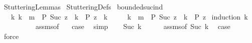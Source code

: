 %
\begin{isabellebody}%
%
%
\isadelimdocument
%
\endisadelimdocument
%
\isatagdocument
%
\isamarkuptrue%
%
\endisatagdocument
{\isafolddocument}%
%
\isadelimdocument
%
\endisadelimdocument
%
\isadelimtheory
%
\endisadelimtheory
%
\isatagtheory
{}\isamarkupfalse%
\ StutteringLemmas\isanewline
\isanewline
{}\ StutteringDefs\isanewline
\isanewline
{}%
\endisatagtheory
{\isafoldtheory}%
%
\isadelimtheory
\isanewline
%
\endisadelimtheory
\isanewline
{}\isamarkupfalse%
\ bounded{\isacharunderscore}suc{\isacharunderscore}ind{\isacharcolon}\isanewline
\ \ \ {\isacartoucheopen}{\isasymAnd}k{\isachardot}\ k\ {\isacharless}\ m\ {\isasymLongrightarrow}\ P\ {\isacharparenleft}Suc\ {\isacharparenleft}z\ {\isacharplus}\ k{\isacharparenright}{\isacharparenright}\ {\isacharequal}\ P\ {\isacharparenleft}z\ {\isacharplus}\ k{\isacharparenright}{\isacartoucheclose}\isanewline
\ \ \ \ \ {\isacartoucheopen}k\ {\isacharless}\ m\ {\isasymLongrightarrow}\ P\ {\isacharparenleft}Suc\ {\isacharparenleft}z\ {\isacharplus}\ k{\isacharparenright}{\isacharparenright}\ {\isacharequal}\ P\ z{\isacartoucheclose}\isanewline
%
\isadelimproof
%
\endisadelimproof
%
\isatagproof
{}\isamarkupfalse%
\ {\isacharparenleft}induction\ k{\isacharparenright}\isanewline
\ \ \isamarkupfalse%
\ {}\isanewline
\ \ \ \ \isamarkupfalse%
\ assms{\isacharparenleft}{}{\isacharparenright}{\isacharbrackleft}of\ {}{\isacharbrackright}\ \isamarkupfalse%
\ {\isacharquery}case\ \isamarkupfalse%
\ simp\isanewline
{}\isamarkupfalse%
\isanewline
\ \ \isamarkupfalse%
\ {\isacharparenleft}Suc\ k{\isacharprime}{\isacharparenright}\isanewline
\ \ \ \ \isamarkupfalse%
\ assms{\isacharbrackleft}of\ {\isacartoucheopen}Suc\ k{\isacharprime}{\isacartoucheclose}{\isacharbrackright}\ \isamarkupfalse%
\ {\isacharquery}case\ \isamarkupfalse%
\ force\isanewline
{}\isamarkupfalse%
%
\endisatagproof
{\isafoldproof}%
%
\isadelimproof
%
\endisadelimproof
%
\isadelimdocument
%
\endisadelimdocument
%
\isatagdocument
%
\isamarkuptrue%
%
\endisatagdocument
{\isafolddocument}%
%
\isadelimdocument
%
\endisadelimdocument
%
\begin{isamarkuptext}%

\end{isamarkuptext}
\end{isabellebody}
